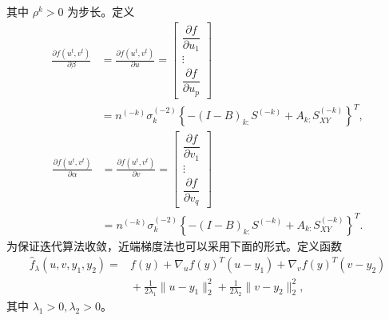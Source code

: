 其中 $\rho^k>0$ 为步长。定义
\begin{equation}
\begin{aligned}
\frac{\partial f(u^t,v^t)}{\partial\beta}
&=\frac{\partial f(u^t,v^t)}{\partial u}
=\begin{bmatrix}
\dfrac{\partial f}{\partial u_1}\\\vdots\\\dfrac{\partial f}{\partial u_p}
\end{bmatrix}\\
&=n^{(-k)}\sigma_k^{(-2)}
\left\{-(I-B)_{k:}S^{(-k)}+A_{k:}S_{XY}^{(-k)}\right\}^T,
\end{aligned}\tag{2.147}
\end{equation}
\begin{equation}
\begin{aligned}
\frac{\partial f(u^t,v^t)}{\partial\alpha}
&=\frac{\partial f(u^t,v^t)}{\partial v}
=\begin{bmatrix}
\dfrac{\partial f}{\partial v_1}\\\vdots\\\dfrac{\partial f}{\partial v_q}
\end{bmatrix}\\
&=n^{(-k)}\sigma_k^{(-2)}
\left\{-(I-B)_{k:}S^{(-k)}+A_{k:}S_{XY}^{(-k)}\right\}^T.
\end{aligned}\tag{2.148}
\end{equation}
为保证迭代算法收敛，近端梯度法也可以采用下面的形式。定义函数
\[
\begin{aligned}
\widehat f_\lambda(u,v,y_1,y_2)
={}&f(y)+\nabla_uf(y)^T(u-y_1)+\nabla_vf(y)^T(v-y_2)\\
&{}+\frac1{2\lambda_1}\lVert u-y_1\rVert_2^2
+\frac1{2\lambda_2}\lVert v-y_2\rVert_2^2,
\end{aligned}
\]
其中 $\lambda_1>0,\lambda_2>0$。

